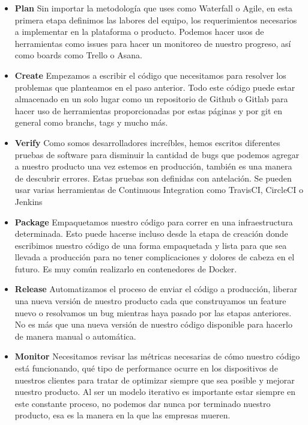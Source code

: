 \documentclass[preprint,12pt]{elsarticle}
\begin{document}
\begin{itemize}
\item \textbf{Plan}
Sin importar la metodología que uses como Waterfall o Agile, en esta primera etapa definimos las labores del equipo, los requerimientos necesarios a implementar en la plataforma o producto.
Podemos hacer usos de herramientas como issues para hacer un monitoreo de nuestro progreso, así como boards como Trello o Asana.

\item \textbf{Create}
Empezamos a escribir el código que necesitamos para resolver los problemas que planteamos en el paso anterior.
Todo este código puede estar almacenado en un solo lugar como un repositorio de Github o Gitlab para hacer uso de herramientas proporcionadas por estas páginas y por git en general como branchs, tags y mucho más.

\item \textbf{Verify}
Como somos desarrolladores increíbles, hemos escritos diferentes pruebas de software para disminuir la cantidad de bugs que podemos agregar a nuestro producto una vez estemos en producción, también es una manera de descubrir errores. Estas pruebas son definidas con antelación.
Se pueden usar varias herramientas de Continuous Integration como TravisCI, CircleCI o Jenkins

\item \textbf{Package}
Empaquetamos nuestro código para correr en una infraestructura determinada. Esto puede hacerse incluso desde la etapa de creación donde escribimos nuestro código de una forma empaquetada y lista para que sea llevada a producción para no tener complicaciones y dolores de cabeza en el futuro.
Es muy común realizarlo en contenedores de Docker.

\item \textbf{Release}
Automatizamos el proceso de enviar el código a producción, liberar una nueva versión de nuestro producto cada que construyamos un feature nuevo o resolvamos un bug mientras haya pasado por las etapas anteriores.
No es más que una nueva versión de nuestro código disponible para hacerlo de manera manual o automática.

\item \textbf{Monitor}
Necesitamos revisar las métricas necesarias de cómo nuestro código está funcionando, qué tipo de performance ocurre en los dispositivos de nuestros clientes para tratar de optimizar siempre que sea posible y mejorar nuestro producto.
Al ser un modelo iterativo es importante estar siempre en este constante proceso, no podemos dar nunca por terminado nuestro producto, esa es la manera en la que las empresas mueren.


\end{itemize}
\end{document}
